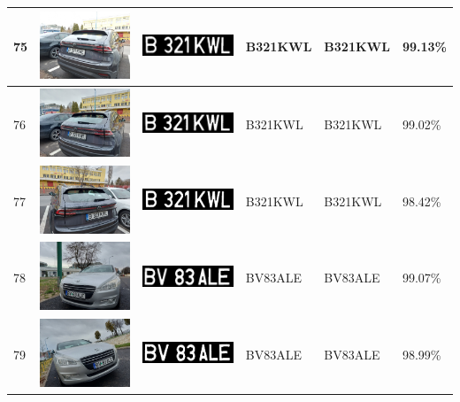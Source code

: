 \documentclass[a4paper,12pt]{report}
\begin{document}
\begin{longtable}{| m{0.6cm} | m{3cm} | m{3cm} | m{1.8cm} | m{1.8cm} | m{1.8cm} |}
        75 & \includegraphics[width=3cm,keepaspectratio]{dataset/43_d1.jpg} & \includegraphics[width=3cm,keepaspectratio]{segmentari/75.jpg} & B321KWL & B321KWL & 99.13\% \\ \hline
        76 & \includegraphics[width=3cm,keepaspectratio]{dataset/43_d2.jpg} & \includegraphics[width=3cm,keepaspectratio]{segmentari/76.jpg} & B321KWL & B321KWL & 99.02\% \\ \hline
        77 & \includegraphics[width=3cm,keepaspectratio]{dataset/43_s1.jpg} & \includegraphics[width=3cm,keepaspectratio]{segmentari/77.jpg} & B321KWL & B321KWL & 98.42\% \\ \hline
        78 & \includegraphics[width=3cm,keepaspectratio]{dataset/44_d1.jpg} & \includegraphics[width=3cm,keepaspectratio]{segmentari/78.jpg} & BV83ALE & BV83ALE & 99.07\% \\ \hline
        79 & \includegraphics[width=3cm,keepaspectratio]{dataset/44_s1.jpg} & \includegraphics[width=3cm,keepaspectratio]{segmentari/79.jpg} & BV83ALE & BV83ALE & 98.99\% \\ \hline

\end{longtable}
\end{document}

